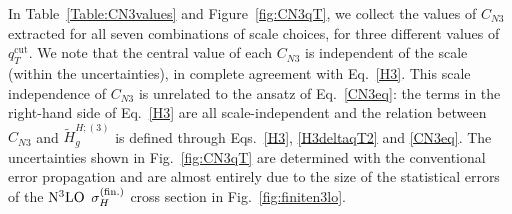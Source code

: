 \documentclass[12pt]{article}
\DeclareRobustCommand{\qtcut}{\ensuremath{q_T^\mathrm{cut}}}
\begin{document}
In Table~\ref{Table:CN3values} and Figure~\ref{fig:CN3qT},
we collect the values of $C_{N3}$ extracted for all seven combinations of scale 
choices, for three different values of $\qtcut$. 
We note that the central value of each $C_{N3}$ is independent of the scale (within the uncertainties), in complete agreement with Eq.~\eqref{H3}. This scale independence of $C_{N3}$ is unrelated to the ansatz of Eq.~\eqref{CN3eq}: the terms in the right-hand side of Eq.~\eqref{H3} are all scale-independent and the relation between $C_{N3}$ and $\widetilde{H}^{H;(3)}_{g}$ is defined through Eqs.~\eqref{H3}, \eqref{H3deltaqT2} and \eqref{CN3eq}. The uncertainties shown in Fig.~\ref{fig:CN3qT} are determined with the conventional error propagation and are almost entirely due to the size of the statistical errors of the $\rm N^3LO$ $\sigma_{H}^{(\rm fin.)}$ cross section in Fig.~\ref{fig:finiten3lo}.
\end{document}
